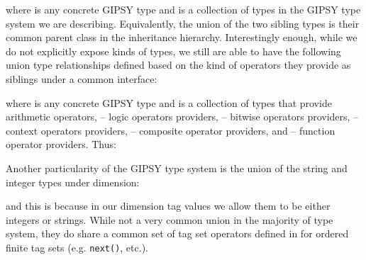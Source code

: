 \documentclass{easychair}
\newcommand{\api}[1]{\texttt{#1}\index{API!#1}}
\begin{document}
\vspace{3mm}

\noindent
where  is any concrete GIPSY type and  is a collection of types
in the GIPSY type system we are describing. Equivalently, the union of the two sibling types is their common
parent class in the inheritance hierarchy. Interestingly enough,
while we do not explicitly expose kinds of types, we still are able
to have the following union type relationships defined based on the
kind of operators they provide as siblings under a common interface:

\vspace{3mm}
\begin{small}











\end{small}
\vspace{3mm}

\noindent
where  is any concrete GIPSY type and  is a collection of types
that provide arithmetic operators,  -- logic operators providers,  -- bitwise
operators providers,   -- context operators providers,  -- composite operator providers,
and  -- function operator providers. Thus:

\vspace{3mm}
\begin{small}











\end{small}
\vspace{3mm}

\noindent
Another particularity of the GIPSY type system is the union of
the string and integer types under dimension:

\vspace{3mm}

\vspace{3mm}

\noindent
and this is because in our dimension tag values we allow them to be
either integers or strings. While not a very common union in the
majority of type system, they do share a common set of tag set
operators defined in \cite{gipsy-context-calculus-07} for ordered
finite tag sets (e.g. \api{next()}, etc.).
\end{document}
